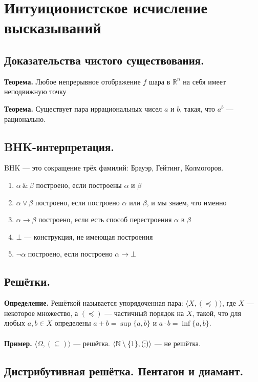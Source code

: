 \documentclass[10pt,a4paper,oneside]{article}
\begin{document}
\section{Интуиционистское исчисление высказываний}
\subsection{Доказательства чистого существования.}

\noindent \textbf{ Теорема. }
Любое непрерывное отображение $f$ шара в $\mathbb{R}^n$ на себя имеет неподвижную точку

\noindent \textbf{ Теорема. }
Существует пара иррациональных чисел $a$ и $b$,
такая, что $a^b$ — рационально.

\subsection{BHK-интерпретация.}
BHK — это сокращение трёх фамилий: Брауэр, Гейтинг, Колмогоров.

\begin{enumerate}

\item $\alpha\ \&\ \beta$ построено, если построены $\alpha$ и $\beta$
\item $\alpha \vee \beta$ построено, если построено $\alpha$ или $\beta$,
и мы знаем, что именно
\item $\alpha\rightarrow\beta$ построено, если есть способ перестроения
$\alpha$ в $\beta$
\item $\bot$ — конструкция, не имеющая построения
\item $\neg\alpha$ построено, если построено $\alpha\rightarrow\bot$

\end{enumerate}


\subsection{Решётки.}
\noindent \textbf{ Определение. } 
Решёткой называется упорядоченная пара: $\langle X, (\preceq)\rangle$, 
где $X$ --- некоторое множество, а $(\preceq)$ --- частичный порядок на $X$, такой, 
что для любых $a,b \in X$ определены $a + b = \sup\{a,b\}$ и $a \cdot b = \inf\{a,b\}$.

\noindent \textbf{ Пример. } 
$\langle\Omega, (\subseteq)\rangle$ --- решётка.
$\langle\mathbb{N}\setminus\{1\}, (\raisebox{-0.75pt}{\vdots})\rangle$ --- не решётка.

\subsection{Дистрибутивная решётка. Пентагон и диамант.}
\end{document}
